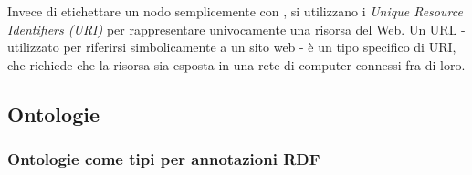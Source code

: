 \noindent
Invece di etichettare un nodo semplicemente con , si utilizzano i \emph{Unique Resource Identifiers (URI)} per rappresentare univocamente una risorsa del Web. Un URL - utilizzato per riferirsi simbolicamente a un sito web - è un tipo specifico di URI, che richiede che la risorsa sia esposta in una rete di computer connessi fra di loro.

\subsection{Ontologie}
\subsubsection[Ontologie come tipi per RDF]{Ontologie come tipi per annotazioni RDF}